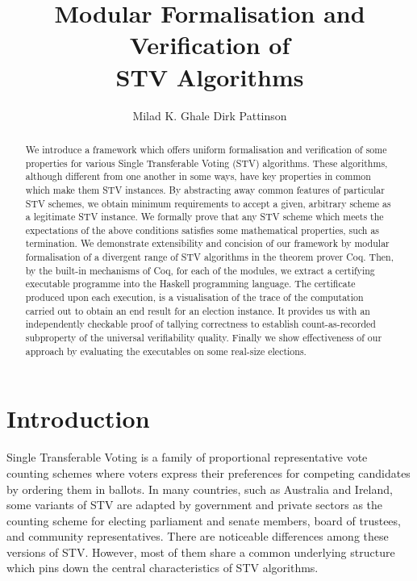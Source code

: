 \documentclass{llncs}
\title{Modular Formalisation and Verification of \\STV Algorithms}
\author{Milad K. Ghale 
\hspace*{0.5cm} Dirk Pattinson}
\institute{Research School of Computer Science, ANU, Canberra}
\begin{document}
\maketitle
\pagestyle{plain}
\thispagestyle{empty}
\begin{abstract}
We introduce a framework which offers uniform formalisation and verification of some properties for various Single Transferable Voting (STV) algorithms.  These algorithms, although different from one another in some ways, have key properties in common which make them STV instances. By abstracting away common features of particular STV schemes, we obtain minimum requirements to accept a given, arbitrary scheme as a legitimate STV instance. We formally prove that any STV scheme which meets the  expectations of the above conditions satisfies some mathematical properties, such as termination. We demonstrate extensibility and concision of our framework by modular formalisation of a divergent range of STV algorithms in the theorem prover Coq. Then, by the built-in mechanisms of Coq, for each of the modules, we extract a certifying executable programme into the Haskell programming language. The certificate produced upon each execution, is a visualisation of the trace of the computation carried out to obtain an end result for an election instance. It provides us with an independently checkable proof of tallying correctness to establish count-as-recorded subproperty of the universal verifiability quality. Finally we show effectiveness of our approach by evaluating the executables on some real-size elections. 
\end{abstract}
\section{Introduction}
 Single Transferable Voting is a family of proportional representative vote counting schemes where voters express their preferences for competing candidates by ordering them in ballots. In many countries, such as Australia and Ireland, some variants of STV are adapted by government and private sectors as the counting scheme for electing parliament and senate members, board of trustees, and community representatives. There are noticeable differences among these versions of STV. However, most of them share a common underlying structure which pins down the central characteristics of STV algorithms.
 
\end{document}
